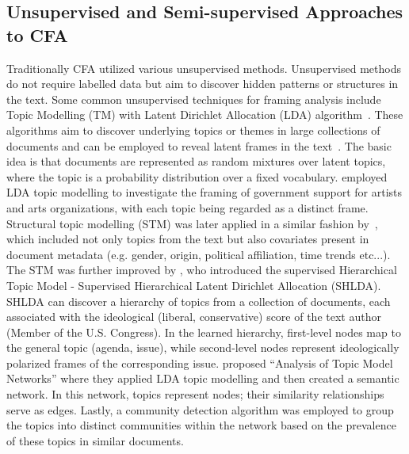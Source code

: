 \subsection{Unsupervised and Semi-supervised Approaches to CFA}
Traditionally CFA utilized various unsupervised methods. 
Unsupervised methods do not require labelled data but aim to discover hidden patterns or structures in the text. 
Some common unsupervised techniques for framing analysis include Topic Modelling (TM) with Latent Dirichlet Allocation (LDA) algorithm~\parencite{blei2003latent}. 
These algorithms aim to discover underlying topics or themes in large collections of documents and can be employed to reveal latent frames in the text~\parencite{blei2012probabilistic}.
The basic idea is that documents are represented as random mixtures over latent topics, where the topic is a probability distribution over a fixed vocabulary.
\textcite{dimaggio2013exploiting} employed LDA topic modelling to investigate the framing of government support for artists and arts organizations, with each topic being regarded as a distinct frame. 
Structural topic modelling (STM) was later applied in a similar fashion by~\textcite{roberts2014structural, gilardi2020policy}, which included not only topics from the text but also covariates present in document metadata (e.g. gender, origin, political affiliation, time trends etc...). 
The STM was further improved by \textcite{nguyen-etal-2015-tea}, who introduced the supervised Hierarchical Topic Model - Supervised Hierarchical Latent Dirichlet Allocation (SHLDA). 
SHLDA can discover a hierarchy of topics from a collection of documents, each associated with the ideological (liberal, conservative) score of the text author (Member of the U.S. Congress).
In the learned hierarchy, first-level nodes map to the general topic (agenda, issue), while second-level nodes represent ideologically polarized frames of the corresponding issue.
\textcite{walter2019news} proposed ``Analysis of Topic Model Networks'' where they applied LDA topic modelling and then created a semantic network. 
In this network, topics represent nodes; their similarity relationships serve as edges.
Lastly, a community detection algorithm was employed to group the topics into distinct communities within the network based on the prevalence of these topics in similar documents.

